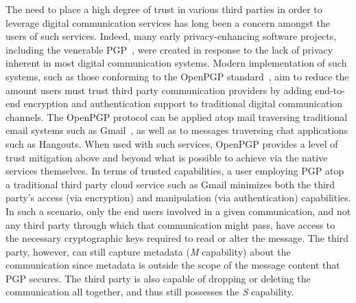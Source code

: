 The need to place a high degree of trust in various third parties in
order to leverage digital communication services has long been a
concern amongst the users of such services. Indeed, many early
privacy-enhancing software projects, including the venerable
PGP~\cite{zimmermann-pgpsource, zimmermann-pgp10}, were created in
response to the lack of privacy inherent in most digital communication
systems. Modern implementation of such systems, such as those
conforming to the OpenPGP standard~\cite{callas2007}, aim to reduce
the amount users must trust third party communication providers by
adding end-to-end encryption and authentication support to traditional
digital communication channels. The OpenPGP protocol can be applied
atop mail traversing traditional email systems such as
Gmail~\cite{google-endtoend}, as well as to messages traversing chat
applications such as Hangouts. When used with such services, OpenPGP
provides a level of trust mitigation above and beyond what is possible
to achieve via the native services themselves. In terms of trusted
capabilities, a user employing PGP atop a traditional third party
cloud service such as Gmail minimizes both the third party's access
(via encryption) and manipulation (via authentication)
capabilities. In such a scenario, only the end users involved in a
given communication, and not any third party through which that
communication might pass, have access to the necessary cryptographic
keys required to read or alter the message. The third party, however,
can still capture metadata (\emph{M} capability) about the
communication since metadata is outside the scope of the message
content that PGP secures. The third party is also capable of dropping
or deleting the communication all together, and thus still possesses
the \emph{S} capability.

